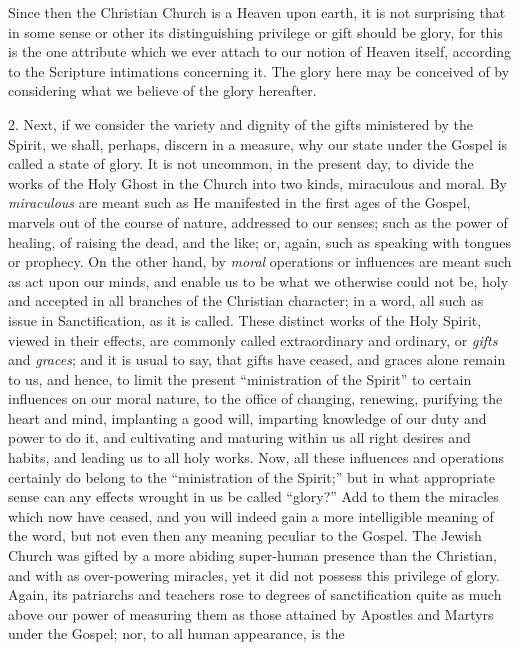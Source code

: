 Since then the Christian Church is a Heaven upon earth, it is not
surprising that in some sense or other its distinguishing privilege or
gift should be glory, for this is the one attribute which we ever
attach to our notion of Heaven itself, according to the Scripture
intimations concerning it. The glory here may be conceived of by
considering what we believe of the glory hereafter.

2. Next, if we consider the variety and dignity of the gifts
ministered by the Spirit, we shall, perhaps, discern in a measure, why
our state under the Gospel is called a state of glory. It is not
uncommon, in the present day, to divide the works of the Holy Ghost in
the Church into two kinds, miraculous and moral. By \emph{miraculous}
are meant such as He manifested in the first ages of the Gospel,
marvels out of the course of nature, addressed to our senses; such as
the power of healing, of raising the dead, and the like; or, again,
such as speaking with tongues or prophecy. On the other hand, by \emph{moral}
operations or influences are meant such as act upon our minds, and
enable us to be what we otherwise could not be, holy and accepted in
all branches of the Christian character; in a word, all such as issue
in Sanctification, as it is called. These distinct works of the Holy
Spirit, viewed in their effects, are commonly called extraordinary and
ordinary, or \emph{gifts} and \emph{graces}; and it is usual to say,
that gifts have ceased, and graces alone remain to us, and hence, to
limit the present ``ministration of the Spirit'' to certain
influences on our moral nature, to the office of changing, renewing,
purifying the heart and mind, implanting a good will, imparting
knowledge of our duty and power to do it, and cultivating and maturing
within us all right desires and habits, and leading us to all holy
works. Now, all these influences and operations certainly do belong to
the ``ministration of the Spirit;'' but in what appropriate
sense can any effects wrought in us be called ``glory?'' Add
to them the miracles which now have ceased, and you will indeed gain a
more intelligible meaning of the word, but not even then any meaning
peculiar to the Gospel. The Jewish Church was gifted by a more abiding
super-human presence than the Christian, and with as over-powering
miracles, yet it did not possess this privilege of glory. Again, its
patriarchs and teachers rose to degrees of sanctification quite as
much above our power of measuring them as those attained by Apostles
and Martyrs under the Gospel; nor, to all human appearance, is the
